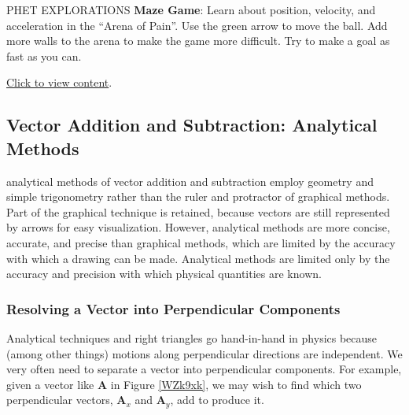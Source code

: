 \documentclass[../../main-ap-physics.tex]{subfiles}
\begin{document}
\begin{gradient}{PHET EXPLORATIONS}
    \textbf{Maze Game}: Learn about position, velocity, and acceleration in the ``Arena of Pain''. Use the green arrow to move the ball. Add more walls to the arena to make the game more difficult. Try to make a goal as fast as you can.

    \vspace{1em}

    \href{https://openstax.org/l/28mazegame}{Click to view content}.
\end{gradient}

\subsection{Vector Addition and Subtraction: Analytical Methods}

\Gls{analytical method}s of vector addition and subtraction employ geometry and simple trigonometry rather than the ruler and protractor of graphical methods. Part of the graphical technique is retained, because vectors are still represented by arrows for easy visualization. However, analytical methods are more concise, accurate, and precise than graphical methods, which are limited by the accuracy with which a drawing can be made. Analytical methods are limited only by the accuracy and precision with which physical quantities are known.

\subsubsection*{Resolving a Vector into Perpendicular Components}

Analytical techniques and right triangles go hand-in-hand in physics because (among other things) motions along perpendicular directions are independent. We very often need to separate a vector into perpendicular components. For example, given a vector like \textbf{A} in Figure \ref{WZk9xk}, we may wish to find which two perpendicular vectors,  $\textbf{A}_x$  and $\textbf{A}_y$, add to produce it.
\end{document}
